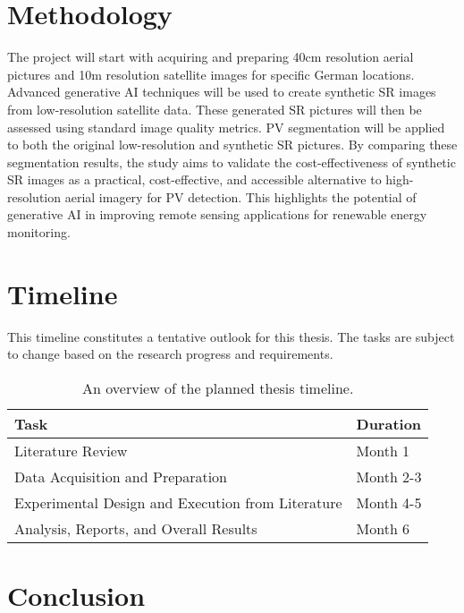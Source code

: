 \chapter{Methodology}\label{chapter:methodology}

The project will start with acquiring and preparing 40cm resolution aerial pictures and 10m resolution satellite images for specific German locations. Advanced generative AI techniques will be used to create synthetic SR images from low-resolution satellite data. These generated SR pictures will then be assessed using standard image quality metrics. PV segmentation will be applied to both the original low-resolution and synthetic SR pictures. By comparing these segmentation results, the study aims to validate the cost-effectiveness of synthetic SR images as a practical, cost-effective, and accessible alternative to high-resolution aerial imagery for PV detection. This highlights the potential of generative AI in improving remote sensing applications for renewable energy monitoring.

\chapter{Timeline}\label{chapter:timeline}

This timeline constitutes a tentative outlook for this thesis. The tasks are subject to change based on the research progress and requirements.

\begin{table}[htpb]
  \caption[Thesis Timeline]{An overview of the planned thesis timeline.}\label{tab:timeline}
  \centering
  \begin{tabular}{ll}
    \toprule
    \textbf{Task} & \textbf{Duration} \\
    \midrule
    Literature Review & Month 1 \\
    Data Acquisition and Preparation & Month 2-3 \\
    Experimental Design and Execution from Literature & Month 4-5 \\
    Analysis, Reports, and Overall Results & Month 6 \\
    \bottomrule
  \end{tabular}
\end{table}

\chapter{Conclusion}\label{chapter:conclusion}

